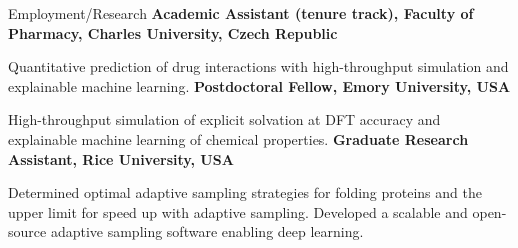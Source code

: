 \begin{rubric}{Employment/Research}
%
  \textbf{Academic Assistant (tenure track), Faculty of Pharmacy, Charles University, Czech Republic}
  \par Quantitative prediction of drug interactions with high-throughput simulation and explainable machine learning. 
\entry*[2020 -- 2022]%
	\textbf{Postdoctoral Fellow, Emory University, USA}
  \par High-throughput simulation of explicit solvation at DFT accuracy and explainable machine learning of chemical properties. 
\entry*[2014 -- 2020]%
  \textbf{Graduate Research Assistant, Rice University, USA}
  \par Determined optimal adaptive sampling strategies for folding proteins and the upper limit for speed up with adaptive sampling. Developed a scalable and open-source adaptive sampling software enabling deep learning.
\end{rubric}

